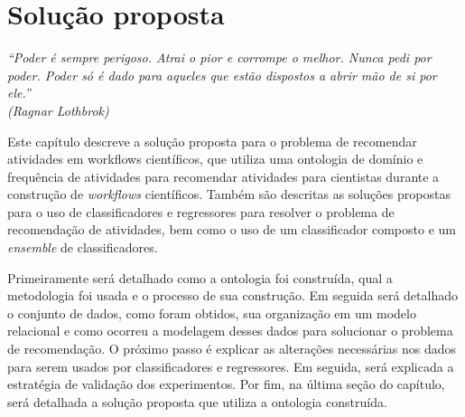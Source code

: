 \chapter{Solu\c{c}{\~a}o proposta}\label{CAP_SOLUCAOPROPOSTA}
\begin{flushright}
	\textit{``Poder é sempre perigoso. Atrai o pior e corrompe o melhor. Nunca pedi por poder. Poder só é dado para aqueles que estão dispostos a abrir mão de si por ele.''\\
			(Ragnar Lothbrok)}
\end{flushright}

Este capítulo descreve a solução proposta para o problema de recomendar atividades em workflows científicos, que utiliza uma ontologia de domínio e frequência de atividades para recomendar atividades para cientistas durante a construção de \emph{workflows} científicos. Também são descritas as soluções propostas para o uso de classificadores e regressores para resolver o problema de recomendação de atividades, bem como o uso de um classificador composto e um \emph{ensemble} de classificadores.

Primeiramente será detalhado como a ontologia foi construída, qual a metodologia foi usada e o processo de sua construção. Em seguida será detalhado o conjunto de dados, como foram obtidos, sua organização em um modelo relacional e como ocorreu a modelagem desses dados para solucionar o problema de recomendação. O próximo passo é explicar as alterações necessárias nos dados para serem usados por classificadores e regressores. Em seguida, será explicada a estratégia de validação dos experimentos. Por fim, na última seção do capítulo, será detalhada a solução proposta que utiliza a ontologia construída.
 \usepackage[utf8]{inputenc}		%
 \usepackage{lastpage}			%
 \usepackage{indentfirst}		%
 \usepackage{color}				%
 \usepackage{graphicx}			%
 
 \usepackage{microtype} 			%
 
 \usepackage{pdfpages}     		%
 \usepackage{algorithm}			%
 \usepackage{mdwlist}			%
 \usepackage[noend]{algpseudocode}			%
 \usepackage{lipsum}				%
 \usepackage{subcaption}
 \usepackage{amsmath}
 \usepackage{epstopdf}
 \usepackage{array}
 \usepackage{graphicx}
 \usepackage{multirow}
 \usepackage{amstext}
 \usepackage{longtable, tabu}
 \usepackage[dvipsnames]{xcolor}
 \usepackage{amsfonts}
 \usepackage{bm}
 
